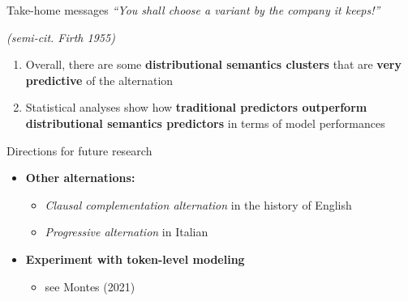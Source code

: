 \documentclass[
  ignorenonframetext,
]{beamer}
\providecommand{\tightlist}{%
  \setlength{\itemsep}{0pt}\setlength{\parskip}{0pt}}\usepackage{longtable,booktabs,array}
\begin{document}
\begin{frame}{Take-home messages}
\protect\hypertarget{take-home-messages}{}
\emph{``You shall choose a variant by the company it keeps!''}

\emph{(semi-cit. Firth 1955)}

\begin{enumerate}
\item
  Overall, there are some \textbf{distributional semantics clusters}
  that are \textbf{very predictive} of the alternation
\item
  Statistical analyses show how \textbf{traditional predictors
  outperform distributional semantics predictors} in terms of model
  performances
\end{enumerate}

\note{\begin{enumerate}
\setcounter{enumi}{1}
\tightlist
\item
  based on the c-value
\end{enumerate}}
\end{frame}

\begin{frame}{Directions for future research}
\protect\hypertarget{directions-for-future-research}{}
\begin{itemize}
\tightlist
\item
  \textbf{Other alternations:}

  \begin{itemize}
  \item
    \emph{Clausal complementation alternation} in the history of English
  \item
    \emph{Progressive alternation} in Italian
  \end{itemize}
\item
  \textbf{Experiment with token-level modeling}

  \begin{itemize}
  \tightlist
  \item
    see Montes (2021)
  \end{itemize}
\end{itemize}

\end{frame}
\end{document}

